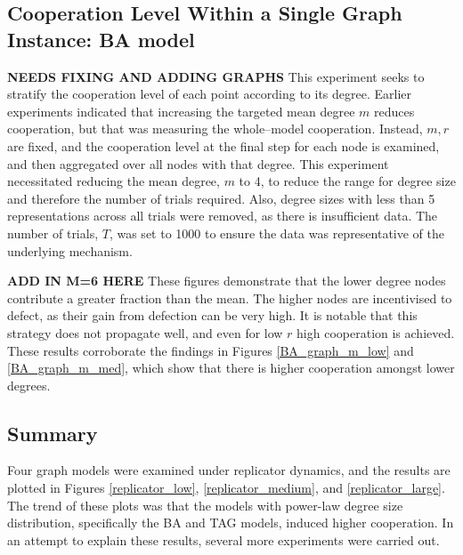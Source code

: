 \subsection{Cooperation Level Within a Single Graph Instance: BA model } \textbf{NEEDS FIXING AND ADDING GRAPHS}
This experiment seeks to stratify the cooperation level of each point according to its degree. Earlier experiments indicated that increasing the targeted mean degree $m$ reduces cooperation, but that was measuring the whole--model cooperation. Instead, $m, r$ are fixed, and the cooperation level at the final step for each node is examined, and then aggregated over all nodes with that degree. This experiment necessitated reducing the mean degree, $m$ to 4, to reduce the range for degree size and therefore the number of trials required. Also, degree sizes with less than 5 representations across all trials were removed, as there is insufficient data. The number of trials, $T$, was set to 1000 to ensure the data was representative of the underlying mechanism. \\
\FloatBarrier
{}
\FloatBarrier

\FloatBarrier
{}
\FloatBarrier

\textbf{ADD IN M=6 HERE}
These figures demonstrate that the lower degree nodes contribute a greater fraction than the mean. The higher nodes are incentivised to defect, as their gain from defection can be very high. It is notable that this strategy does not propagate well, and even for low $r$ high cooperation is achieved. These results corroborate the findings in Figures \ref{BA_graph_m_low} and \ref{BA_graph_m_med}, which show that there is higher cooperation amongst lower degrees. \\

\subsection{Summary}
Four graph models were examined under replicator dynamics, and the results are plotted in Figures \ref{replicator_low}, \ref{replicator_medium}, and \ref{replicator_large}. The trend of these plots was that the models with power-law degree size distribution, specifically the BA and TAG models, induced higher cooperation. In an attempt to explain these results, several more experiments were carried out. \\

